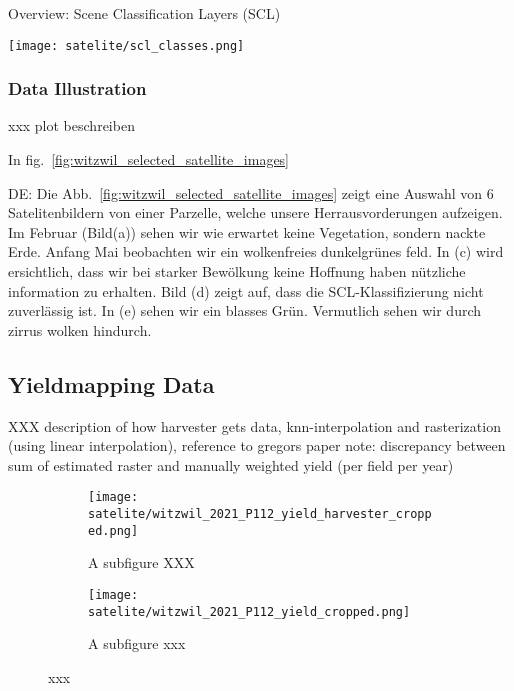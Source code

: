 {{			
			\begin{table}[h]
				\caption{Overview: Scene Classification Layers (SCL)}
				\label{tab:satelite/scl_classes}
				\center
				\texttt{[image: satelite/scl\_classes.png]}
			\end{table}
		}

		\subsubsection*{Data Illustration}{
			xxx plot beschreiben
			
			In fig.~\ref{fig:witzwil_selected_satellite_images} 

			DE:  
			Die Abb.~\ref{fig:witzwil_selected_satellite_images} zeigt eine Auswahl von 6 Satelitenbildern von einer Parzelle, welche unsere Herrausvorderungen aufzeigen. Im Februar (Bild(a)) sehen wir wie erwartet keine Vegetation, sondern nackte Erde. Anfang Mai beobachten wir ein wolkenfreies dunkelgrünes feld. In (c) wird ersichtlich, dass wir bei starker Bewölkung keine Hoffnung haben nützliche information zu erhalten. Bild (d) zeigt auf, dass die SCL-Klassifizierung nicht zuverlässig ist. In (e) sehen wir ein blasses Grün. Vermutlich sehen wir durch zirrus wolken hindurch.   
			
		}
	}

	\subsection{Yieldmapping Data}{
		XXX description of how harvester gets data, knn-interpolation and rasterization (using linear interpolation), reference to gregors paper
		note: discrepancy between sum of estimated raster and manually weighted yield (per field per year)
		\begin{figure}
			\centering
			\begin{subfigure}{.5\textwidth}
			  \centering
			  \texttt{[image: satelite/witzwil\_2021\_P112\_yield\_harvester\_cropped.png]}
			  \caption{A subfigure XXX}
			\end{subfigure}%
			\begin{subfigure}{.5\textwidth}
				\centering
				\texttt{[image: satelite/witzwil\_2021\_P112\_yield\_cropped.png]}
			  \caption{A subfigure xxx}
			\end{subfigure}
			\caption{xxx}
			\label{fig:test}
		\end{figure}
	}




